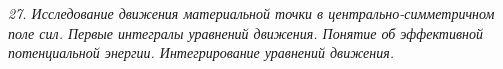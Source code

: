 \emph{27. Исследование движения материальной точки в центрально-симметричном
поле сил. Первые интегралы уравнений движения. Понятие об эффективной
потенциальной энергии. Интегрирование уравнений движения.}

\newpage
